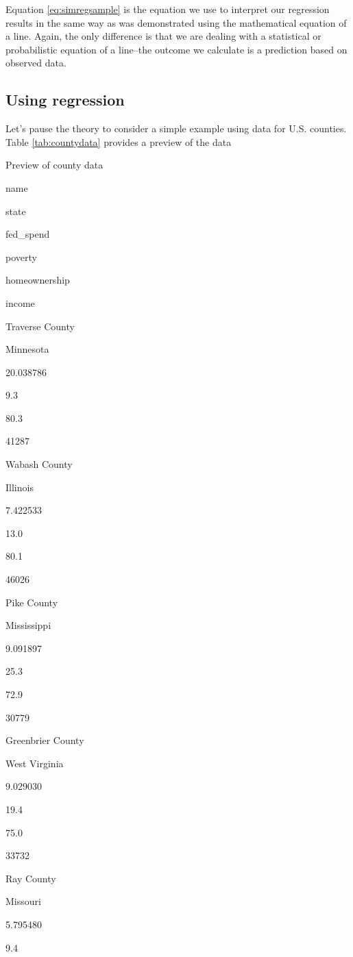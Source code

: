 \documentclass[
]{book}
\begin{document}
Equation \eqref{eq:simregsample} is the equation we use to interpret our regression results in the same way as was demonstrated using the mathematical equation of a line. Again, the only difference is that we are dealing with a statistical or probabilistic equation of a line--the outcome we calculate is a prediction based on observed data.

\hypertarget{using-regression}{%
\subsection{Using regression}\label{using-regression}}

Let's pause the theory to consider a simple example using data for U.S. counties. Table \ref{tab:countydata} provides a preview of the data

\label{tab:countydata}Preview of county data

name

state

fed\_spend

poverty

homeownership

income

Traverse County

Minnesota

20.038786

9.3

80.3

41287

Wabash County

Illinois

7.422533

13.0

80.1

46026

Pike County

Mississippi

9.091897

25.3

72.9

30779

Greenbrier County

West Virginia

9.029030

19.4

75.0

33732

Ray County

Missouri

5.795480

9.4
\end{document}

